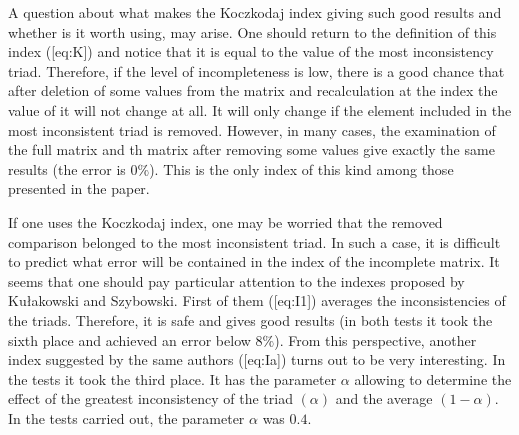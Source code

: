 A question about what makes the Koczkodaj index giving such good results and whether is it worth using, may arise. One should return to the definition of this index ([eq:K]) and notice that it is equal to the value of the most inconsistency triad. Therefore, if the level of incompleteness is low, there is a good chance that after deletion of some values from the matrix and recalculation at the index the value of it will not change at all. It will only change if the element included in the most inconsistent triad is removed. However, in many cases, the examination of the full matrix and th matrix after removing some values give exactly the same results (the error is $0\%$). This is the only index of this kind among those presented in the paper.

If one uses the Koczkodaj index, one may be worried that the removed comparison belonged to the most inconsistent triad. In such a case, it is difficult to predict what error will be contained in the index of the incomplete matrix. It seems that one should pay particular attention to the indexes proposed by Kułakowski and Szybowski. First of them ([eq:I1]) averages the inconsistencies of the triads. Therefore, it is safe and gives good results (in both tests it took the sixth place and achieved an error below $8\%$). From this perspective, another index suggested by the same authors ([eq:Ia]) turns out to be very interesting. In the tests it took the third place. It has the parameter $\alpha$ allowing to determine the effect of the greatest inconsistency of the triad $\left(\alpha\right)$ and the average $\left(1-\alpha\right)$. In the tests carried out, the parameter $\alpha$ was $0.4$.